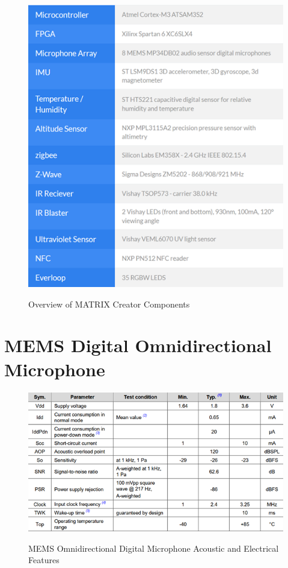 \documentclass[hidelinks,12pt]{report} %
\begin{document}
\begin{figure}[h]
\centering
\includegraphics[scale = 1.0]{figa.1} 
\caption{Overview of MATRIX Creator Components}\cite{40}
\label{fig}
\end{figure}

\chapter{MEMS Digital Omnidirectional Microphone}


\begin{figure}[h]
\centering
\includegraphics[scale = 1.0]{figb.1} 
\caption{MEMS Omnidirectional Digital Microphone Acoustic and Electrical Features}\cite{41}
\label{fig}
\end{figure}
\end{document}
